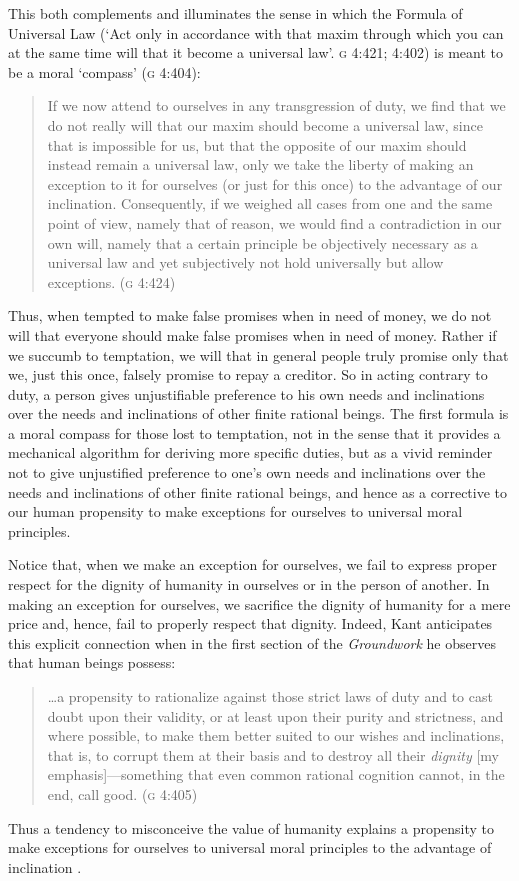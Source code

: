 \documentclass[12pt]{article}
\begin{document}
This both complements and illuminates the sense in which the Formula of Universal Law (`Act only in accordance with that maxim through which you can at the same time will that it become a universal law'. \textsc{g} 4:421; 4:402) is meant to be a moral `compass' (\textsc{g} 4:404): 
\begin{quote}
	If we now attend to ourselves in any transgression of duty, we find that we do not really will that our maxim should become a universal law, since that is impossible for us, but that the opposite of our maxim should instead remain a universal law, only we take the liberty of making an exception to it for ourselves (or just for this once) to the advantage of our inclination. Consequently, if we weighed all cases from one and the same point of view, namely that of reason, we would find a contradiction in our own will, namely that a certain principle be objectively necessary as a universal law and yet subjectively not hold universally but allow exceptions. (\textsc{g} 4:424) 
\end{quote}
Thus, when tempted to make false promises when in need of money, we do not will that everyone should make false promises when in need of money. Rather if we succumb to temptation, we will that in general people truly promise only that we, just this once, falsely promise to repay a creditor. So in acting contrary to duty, a person gives unjustifiable preference to his own needs and inclinations over the needs and inclinations of other finite rational beings. The first formula is a moral compass for those lost to temptation, not in the sense that it provides a mechanical algorithm for deriving more specific duties, but as a vivid reminder not to give unjustified preference to one's own needs and inclinations over the needs and inclinations of other finite rational beings, and hence as a corrective to our human propensity to make exceptions for ourselves to universal moral principles. 

Notice that, when we make an exception for ourselves, we fail to express proper respect for the dignity of humanity in ourselves or in the person of another. In making an exception for ourselves, we sacrifice the dignity of humanity for a mere price and, hence, fail to properly respect that dignity. Indeed, Kant anticipates this explicit connection when in the first section of the \emph{Groundwork} he observes that human beings possess: 
\begin{quote}
	\ldots a propensity to rationalize against those strict laws of duty and to cast doubt upon their validity, or at least upon their purity and strictness, and where possible, to make them better suited to our wishes and inclinations, that is, to corrupt them at their basis and to destroy all their \emph{dignity} [my emphasis]---something that even common rational cognition cannot, in the end, call good. (\textsc{g} 4:405) 
\end{quote}
Thus a tendency to misconceive the value of humanity explains a propensity to make exceptions for ourselves to universal moral principles to the advantage of inclination \citep[for a similar account of the role of dignity in explaining the injunction to never treat a person merely as a means see][]{Thomas-Hill:1992nr}. 
\end{document}
